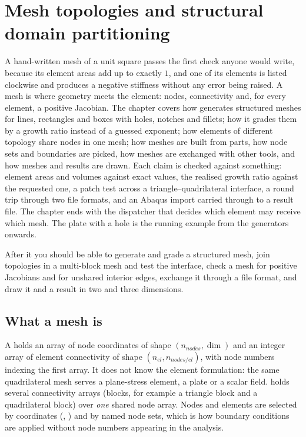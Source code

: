 \chapter{Mesh topologies and structural domain partitioning}\label{ch:mesh}

\begin{tcolorbox}[colback=gray!5,colframe=gray!50,title={In this chapter}]
A hand-written mesh of a unit square passes the first check anyone would write, because its element areas add up to exactly $1$, and one of its elements is listed clockwise and produces a negative stiffness without any error being raised. A mesh is where geometry meets the element: nodes, connectivity and, for every element, a positive Jacobian. The chapter covers how \fea{} generates structured meshes for lines, rectangles and boxes with holes, notches and fillets; how it grades them by a growth ratio instead of a guessed exponent; how elements of different topology share nodes in one mesh; how meshes are built from parts, how node sets and boundaries are picked, how meshes are exchanged with other tools, and how meshes and results are drawn. Each claim is checked against something: element areas and volumes against exact values, the realised growth ratio against the requested one, a patch test across a triangle--quadrilateral interface, a round trip through two file formats, and an Abaqus import carried through to a result file. The chapter ends with the dispatcher that decides which element may receive which mesh. The plate with a hole is the running example from the generators onwards.\par\smallskip
After it you should be able to generate and grade a structured mesh, join topologies in a multi-block mesh and test the interface, check a mesh for positive Jacobians and for unshared interior edges, exchange it through a file format, and draw it and a result in two and three dimensions.
\end{tcolorbox}

\section{What a mesh is}\label{sec:me-what}

A  holds an array of node coordinates of shape $(n_{nodes},\dim)$ and an integer array of element connectivity of shape $(n_{el},n_{nodes/el})$, with node numbers indexing the first array. It does not know the element formulation: the same quadrilateral mesh serves a plane-stress element, a plate or a scalar field.  holds several connectivity arrays (blocks, for example a triangle block and a quadrilateral block) over \emph{one} shared node array. Nodes and elements are selected by coordinates (, ) and by named node sets, which is how boundary conditions are applied without node numbers appearing in the analysis.

